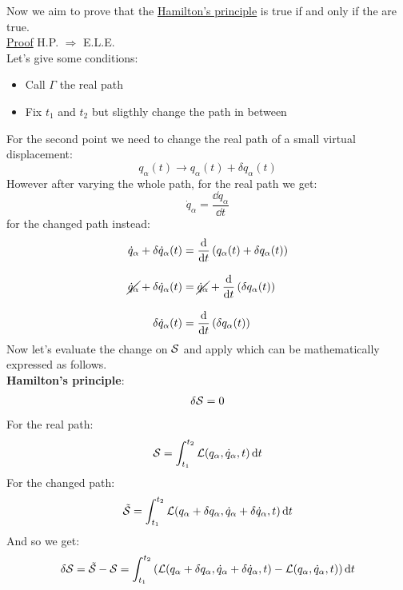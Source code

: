 Now we aim to prove that the \hyperref[q:Hamilton_principle_quote]{Hamilton's principle} is true if and only if the \eleref\;are true.\\
\underline{Proof} H.P. $\Rightarrow$ E.L.E.\\
Let's give some conditions:
\begin{itemize}
    \item Call $\Gamma$ the real path
    \item Fix $t_1$ and $t_2$ but sligthly change the path in between
\end{itemize}
For the second point we need to change the real path of a small virtual displacement:
\begin{equation}
    q_{\alpha}(t) \longrightarrow q_{\alpha}(t) + \delta q_{\alpha}(t)
\end{equation}
However after varying the whole path, for the real path we get:
\begin{equation}
    \dot{q}_{\alpha} = \dfrac{\dd{q_{\alpha}}}{\dd{t}}
\end{equation}
for the changed path instead:
\begin{equation}
    \begin{split}
      \dot{q}_{\alpha} + \delta \dot{q}_{\alpha}(t) &= \dv{}{t}\brackets{q_{\alpha}(t) + \delta q_{\alpha}(t)} \\[8pt]
      \cancel{\dot{q}_{\alpha}} + \delta \dot{q}_{\alpha}(t) &= \cancel{\dot{q}_{\alpha}} + \dv{}{t}\brackets{\delta q_{\alpha}(t)} \\[8pt]
      \delta \dot{q}_{\alpha}(t) &= \dv{}{t}\brackets{\delta q_{\alpha}(t)}
    \end{split}
\end{equation}
Now let's evaluate the change on $\mathcal{S}$ and apply \hpquoteref\;which can be mathematically expressed as follows.\\\textbf{Hamilton's principle}:
\begin{equation} \label{e:Hamilton_principle}
    \delta \mathcal{S} = 0
\end{equation}
For the real path:
\begin{equation}
    \mathcal{S} = \int_{t_1}^{t_2}\mathcal{L}(q_{\alpha},\dot{q}_{\alpha},t) \dd{t}
\end{equation}
For the changed path:
\begin{equation}
    \tilde{\mathcal{S}} = \int_{t_1}^{t_2}\mathcal{L}(q_{\alpha}+\delta q_{\alpha},\dot{q}_{\alpha} + \delta \dot{q}_{\alpha},t) \dd{t}
\end{equation}
And so we get:
\begin{equation}
    \delta \mathcal{S} = \tilde{\mathcal{S}} - \mathcal{S} = \int_{t_1}^{t_2}\left(\mathcal{L}(q_{\alpha}+\delta q_{\alpha},\dot{q}_{\alpha} + \delta \dot{q}_{\alpha},t) - \mathcal{L}(q_{\alpha},\dot{q}_{\alpha},t)\right) \dd{t}
\end{equation}

